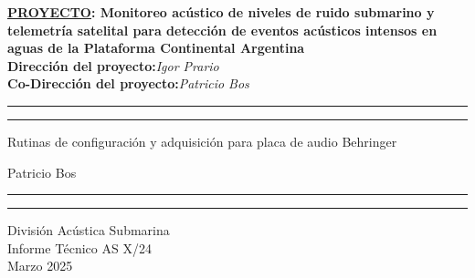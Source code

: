 \thispagestyle{empty}


	\noindent
	\begin{minipage}[c][50mm][c]{1.0\linewidth} 
		\begin{center}
			\Large{\textbf{\underline{PROYECTO}: Monitoreo acústico de niveles de ruido submarino y telemetría satelital para detección de eventos acústicos intensos en aguas de la Plataforma Continental Argentina}}\\
			\vspace{2mm}		
			\textbf{Dirección del proyecto:}\hspace{2pc}\textit{Igor Prario}\\
			\textbf{Co-Dirección del proyecto:}\hspace{2pc}\textit{Patricio Bos}\\
		\end{center}
	\end{minipage}
	\vspace{1mm}


	\noindent
	\begin{minipage}[c][70mm][c]{1.0\linewidth} 
		{\hrule\hrule}
 		\vspace{5mm}
		\begin{flushleft}
			\huge{Rutinas de configuración y adquisición para placa de audio Behringer}
		\end{flushleft}
		\vspace{8mm}
		\begin{flushright}
			\Large{Patricio Bos}\\
		\end{flushright}
		\vspace{2mm}
		{\hrule\hrule}
	\end{minipage}
	\vspace{-5mm}

	\noindent
	\begin{minipage}[c][30mm][c]{1.0\linewidth} 		
		\begin{flushright}
			\Large{División Acústica Submarina\\
				Informe Técnico AS X/24\\
				Marzo 2025}\\
		\end{flushright}
	\end{minipage}
	\vspace{5mm}
	